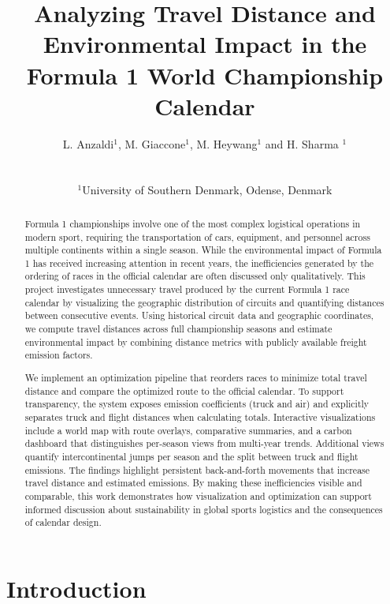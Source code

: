 \documentclass{egpubl}
\title[]%
      {Analyzing Travel Distance and Environmental Impact in the Formula 1 World Championship Calendar}
\author[Luca Anzaldi, Massimo Giaccone, Martin Heywang \& Himanshu Sharma]
{\parbox{\textwidth}{\centering L. Anzaldi$^{1}$, M. Giaccone$^{1}$, M. Heywang$^{1}$ and H. Sharma $^{1}$
        }
        \\
{\parbox{\textwidth}{\centering $^1$University of Southern Denmark, Odense, Denmark}
}
}
\begin{document}

\maketitle
\begin{abstract}

Formula 1 championships involve one of the most complex logistical operations in modern sport, requiring the transportation of cars, equipment, and personnel across multiple continents within a single season. While the environmental impact of Formula 1 has received increasing attention in recent years, the inefficiencies generated by the ordering of races in the official calendar are often discussed only qualitatively. This project investigates unnecessary travel produced by the current Formula 1 race calendar by visualizing the geographic distribution of circuits and quantifying distances between consecutive events. Using historical circuit data and geographic coordinates, we compute travel distances across full championship seasons and estimate environmental impact by combining distance metrics with publicly available freight emission factors.

We implement an optimization pipeline that reorders races to minimize total travel distance and compare the optimized route to the official calendar. To support transparency, the system exposes emission coefficients (truck and air) and explicitly separates truck and flight distances when calculating totals. Interactive visualizations include a world map with route overlays, comparative summaries, and a carbon dashboard that distinguishes per-season views from multi-year trends. Additional views quantify intercontinental jumps per season and the split between truck and flight emissions. The findings highlight persistent back-and-forth movements that increase travel distance and estimated emissions. By making these inefficiencies visible and comparable, this work demonstrates how visualization and optimization can support informed discussion about sustainability in global sports logistics and the consequences of calendar design.

\end{abstract}  
\section{Introduction}
\end{document}
